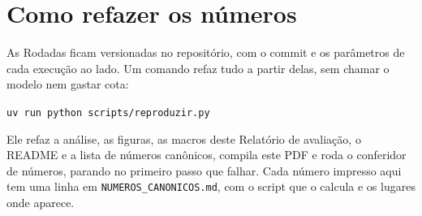 \documentclass[11pt,a4paper]{article}
\begin{document}
\clearpage
\appendix
\section{Como refazer os números}

As Rodadas ficam versionadas no repositório, com o commit e os parâmetros de
cada execução ao lado. Um comando refaz tudo a partir delas, sem chamar o
modelo nem gastar cota:

\begin{center}
  \texttt{uv run python scripts/reproduzir.py}
\end{center}

Ele refaz a análise, as figuras, as macros deste Relatório de avaliação, o
README e a lista de números canônicos, compila este PDF e roda o conferidor
de números, parando no primeiro passo que falhar. Cada número impresso aqui
tem uma linha em \texttt{NUMEROS\_CANONICOS.md}, com o script que o calcula
e os lugares onde aparece.
\end{document}
